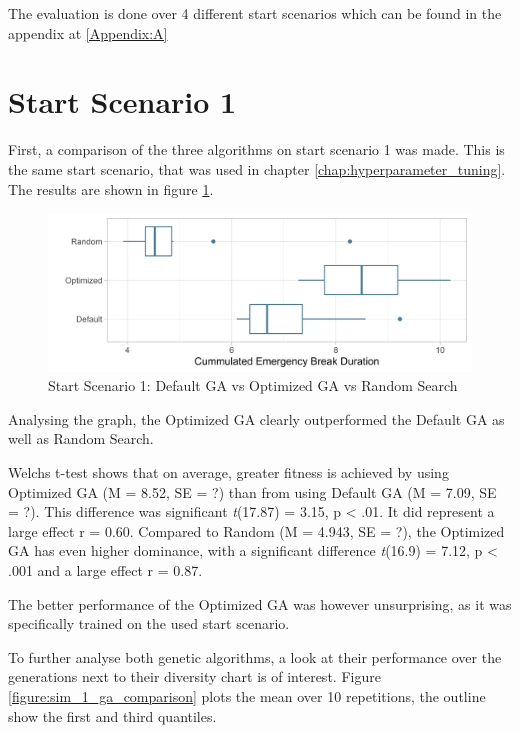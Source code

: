The evaluation is done over 4 different start scenarios which can be found in the appendix at \ref{Appendix:A}

\section{Start Scenario 1}
First, a comparison of the three algorithms on start scenario 1 was made. This is the same start scenario, that was used in chapter \ref{chap:hyperparameter_tuning}. The results are shown in figure \ref{figure:sim_1_comparison}.

\begin{figure}[ht] 
	\label{figure:sim_1_comparison}
	\includegraphics[width=1\linewidth]{simulations/evaluation/plots/sim_1_comparison}
	\caption{Start Scenario 1: Default GA vs Optimized GA vs Random Search}
\end{figure}

Analysing the graph, the Optimized GA clearly outperformed the Default GA as well as Random Search.

Welchs t-test shows that on average, greater fitness is achieved by using Optimized GA (M = 8.52, SE = ?) than from using Default GA (M = 7.09, SE = ?). This difference was significant \textit{t}(17.87) = 3.15, p < .01. It did represent a large effect r = 0.60.
Compared to Random (M = 4.943, SE = ?), the Optimized GA has even higher dominance, with a significant difference \textit{t}(16.9) = 7.12, p < .001 and a large effect r = 0.87.

The better performance of the Optimized GA was however unsurprising, as it was specifically trained on the used start scenario.

To further analyse both genetic algorithms, a look at their performance over the generations next to their diversity chart is of interest. Figure \ref{figure:sim_1_ga_comparison} plots the mean over 10 repetitions, the outline show the first and third quantiles.

